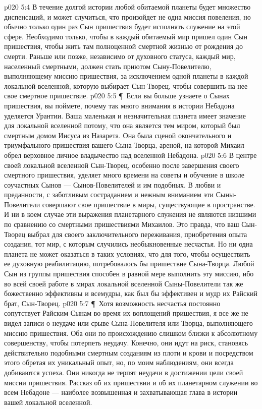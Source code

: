 \vs p020 5:4 В течение долгой истории любой обитаемой планеты будет множество диспенсаций, и может случиться, что произойдет не одна миссия повеления, но обычно только один раз Сын пришествия будет исполнять служение на этой сфере. Необходимо только, чтобы в каждый обитаемый мир пришел один Сын пришествия, чтобы жить там полноценной смертной жизнью от рождения до смерти. Раньше или позже, независимо от духовного статуса, каждый мир, населенный смертными, должен стать приютом Сыну\hyp{}Повелителю, выполняющему миссию пришествия, за исключением одной планеты в каждой локальной вселенной, которую выбирает Сын\hyp{}Творец, чтобы совершить на нее свое смертное пришествие.
\vs p020 5:5 \P\ Если вы больше узнаете о Сынах пришествия, вы поймете, почему так много внимания в истории Небадона уделяется Урантии. Ваша маленькая и незначительная планета имеет значение для локальной вселенной потому, что она является тем миром, который был смертным домом Иисуса из Назарета. Она была сценой окончательного и триумфального пришествия вашего Сына\hyp{}Творца, ареной, на которой Михаил обрел верховное личное владычество над вселенной Небадона.
\vs p020 5:6 В центре своей локальной вселенной Сын\hyp{}Творец, особенно после завершения своего смертного пришествия, уделяет много времени на советы и обучение в школе соучастных Сынов --- Сынов\hyp{}Повелителей и им подобных. В любви и преданности, с заботливым состраданием и нежным вниманием эти Сыны\hyp{}Повелители совершают свое пришествие в миры, существующие в пространстве. И ни в коем случае эти выражения планетарного служения не являются низшими по сравнению со смертными пришествиями Михаилов. Это правда, что ваш Сын\hyp{}Творец выбрал для своего заключительного переживания, приобретения опыта создания, тот мир, с которым случились необыкновенные несчастья. Но ни одна планета не может оказаться в таких условиях, что для того, чтобы осуществить ее духовную реабилитацию, потребовалось бы пришествие Сына\hyp{}Творца. Любой Сын из группы пришествия способен в равной мере выполнить эту миссию, ибо во всей своей работе в мирах локальной вселенной Сыны\hyp{}Повелители так же божественно эффективны и всемудры, как был бы эффективен и мудр их Райский брат, Сын\hyp{}Творец.
\vs p020 5:7 \P\ Хотя возможность несчастья постоянно сопутствует Райским Сынам во время их воплощений пришествия, я все же не видел записи о неудаче или срыве Сына\hyp{}Повелителя или Творца, выполняющего миссию пришествия. Оба они по происхождению слишком близки к абсолютному совершенству, чтобы потерпеть неудачу. Конечно, они идут на риск, становясь действительно подобными смертным созданиям из плоти и крови и посредством этого обретая их уникальный опыт, но, по моим наблюдениям, они всегда добиваются успеха. Они никогда не терпят неудачи в достижении цели своей миссии пришествия. Рассказ об их пришествии и об их планетарном служении во всем Небадоне --- наиболее возвышенная и захватывающая глава в истории вашей локальной вселенной.
